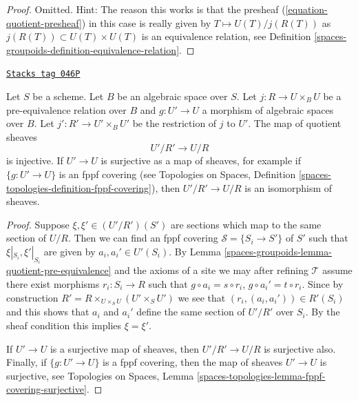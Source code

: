 \begin{proof}
Omitted. Hint: The reason this works is that the presheaf
(\ref{equation-quotient-presheaf}) in this case is really given
by $T \mapsto U(T)/j(R(T))$ as $j(R(T)) \subset U(T) \times U(T)$
is an equivalence relation, see
Definition \ref{spaces-groupoids-definition-equivalence-relation}.
\end{proof}

\begin{lemma}
\label{spaces-groupoids-lemma-quotient-pre-equivalence-relation-restrict}
\href{https://stacks.math.columbia.edu/tag/046P}{\texttt{Stacks tag 046P}}

Let $S$ be a scheme. Let $B$ be an algebraic space over $S$.
Let $j : R \to U \times_B U$ be a pre-equivalence relation over $B$
and $g : U' \to U$ a morphism of algebraic spaces over $B$.
Let $j' : R' \to U' \times_B U'$ be the restriction of $j$ to $U'$.
The map of quotient sheaves
$$
U'/R' \longrightarrow U/R
$$
is injective. If $U' \to U$ is surjective as a map of sheaves, for
example if $\{g : U' \to U\}$ is an fppf covering (see
Topologies on Spaces,
Definition \ref{spaces-topologies-definition-fppf-covering}),
then $U'/R' \to U/R$ is an isomorphism of sheaves.
\end{lemma}

\begin{proof}
Suppose $\xi, \xi' \in (U'/R')(S')$ are sections which
map to the same section of $U/R$.
Then we can find an fppf covering $\mathcal{S} = \{S_i \to S'\}$ of $S'$
such that $\xi|_{S_i}, \xi'|_{S_i}$ are given by $a_i, a_i' \in U'(S_i)$. By
Lemma \ref{spaces-groupoids-lemma-quotient-pre-equivalence}
and the axioms of a site we may after refining
$\mathcal{T}$ assume there exist morphisms $r_i : S_i \to R$
such that $g \circ a_i = s \circ r_i$, $g \circ a_i' = t \circ r_i$.
Since by construction
$R' = R \times_{U \times_S U} (U' \times_S U')$
we see that $(r_i, (a_i, a_i')) \in R'(S_i)$ and this
shows that $a_i$ and $a_i'$ define the same section
of $U'/R'$ over $S_i$. By the sheaf condition this implies
$\xi = \xi'$.

\medskip\noindent
If $U' \to U$ is a surjective map of sheaves, then $U'/R' \to U/R$ is
surjective also. Finally, if $\{g : U' \to U\}$ is a fppf covering, then
the map of sheaves $U' \to U$ is surjective, see
Topologies on Spaces,
Lemma \ref{spaces-topologies-lemma-fppf-covering-surjective}.
\end{proof}

